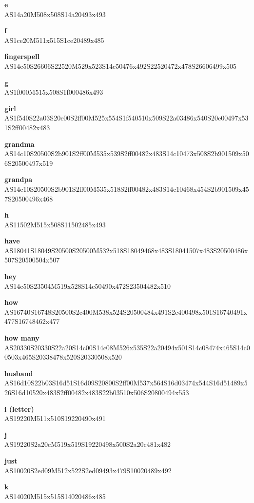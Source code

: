 \documentclass{article}
\begin{document}
\begin{glossary}
\textbf{e}\\
AS14a20M508x508S14a20493x493

\textbf{f}\\
AS1ce20M511x515S1ce20489x485

\textbf{fingerspell}\\
AS14c50S26606S22520M529x523S14c50476x492S22520472x478S26606499x505

\textbf{g}\\
AS1f000M515x508S1f000486x493

\textbf{girl}\\
AS1f540S22a03S20e00S2ff00M525x554S1f540510x509S22a03486x540S20e00497x531S2ff00482x483

\textbf{grandma}\\
AS14c10S20500S2b901S2ff00M535x539S2ff00482x483S14c10473x508S2b901509x506S20500497x519

\textbf{grandpa}\\
AS14c10S20500S2b901S2ff00M535x518S2ff00482x483S14c10468x454S2b901509x457S20500496x468

\textbf{h}\\
AS11502M515x508S11502485x493

\textbf{have}\\
AS18041S18049S20500S20500M532x518S18049468x483S18041507x483S20500486x507S20500504x507

\textbf{hey}\\
AS14c50S23504M519x528S14c50490x472S23504482x510

\textbf{how}\\
AS16740S16748S20500S2c400M538x524S20500484x491S2c400498x501S16740491x477S16748462x477

\textbf{how many}\\
AS20330S20330S22a20S14c00S14c08M526x535S22a20494x501S14c08474x465S14c00503x465S20338478x520S20330508x520

\textbf{husband}\\
AS16d10S22b03S16d51S16d09S20800S2ff00M537x564S16d03474x544S16d51489x526S16d10520x483S2ff00482x483S22b03510x506S20800494x553

\textbf{i (letter)}\\
AS19220M511x510S19220490x491

\textbf{j}\\
AS19220S2a20cM519x519S19220498x500S2a20c481x482

\textbf{just}\\
AS10020S2ed09M512x522S2ed09493x479S10020489x492

\textbf{k}\\
AS14020M515x515S14020486x485


\end{glossary}
\end{document}
